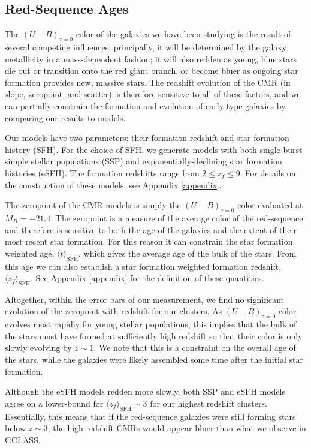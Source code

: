 \subsection{Red-Sequence Ages}\label{sec-CMR-age}

The $(U-B)_{z=0}$ color of the galaxies we have been studying is the result of several competing influences: principally, it will be determined by the galaxy metallicity in a mass-dependent fashion; it will also redden as young, blue stars die out or transition onto the red giant branch, or become bluer as ongoing star formation provides new, massive stars. The redshift evolution of the CMR (in slope, zeropoint, and scatter) is therefore sensitive to all of these factors, and we can partially constrain the formation and evolution of early-type galaxies by comparing our results to models.

Our models have two parameters: their formation redshift and star formation history (SFH). For the choice of SFH, we generate models with both single-burst simple stellar populations (SSP) and exponentially-declining star formation histories (eSFH). The formation redshifts range from $ 2 \leq z_f \leq 9$. For details on the construction of these models, see Appendix \ref{appendix}.

The zeropoint of the CMR models is simply the $(U-B)_{z=0}$ color evaluated at $M_{B}=-21.4$. The zeropoint is a measure of the average color of the red-sequence and therefore is sensitive to both the age of the galaxies and the extent of their most recent star formation. For this reason it can constrain the star formation weighted age, $\langle t \rangle_\mathrm{SFH}$, which gives the average age of the bulk of the stars. From this age we can also establish a star formation weighted formation redshift, $\langle z_f \rangle_\mathrm{SFH}$. See Appendix \ref{appendix} for the definition of these quantities.

Altogether, within the error bars of our measurement, we find no significant evolution of the zeropoint with redshift for our clusters. As $(U-B)_{z=0}$ color evolves most rapidly for young stellar populations, this implies that the bulk of the stars must have formed at sufficiently high redshift so that their color is only slowly evolving by $z \sim 1$. We note that this is a constraint on the overall age of the stars, while the galaxies were likely assembled some time after the initial star formation.

Although the eSFH models redden more slowly, both SSP and eSFH models agree on a lower-bound for $\langle z_f \rangle_\mathrm{SFH} \sim 3$ for our highest redshift clusters. Essentially, this means that if the red-sequence galaxies were still forming stars below $z \sim 3$, the high-redshift CMRs would appear bluer than what we observe in GCLASS.

